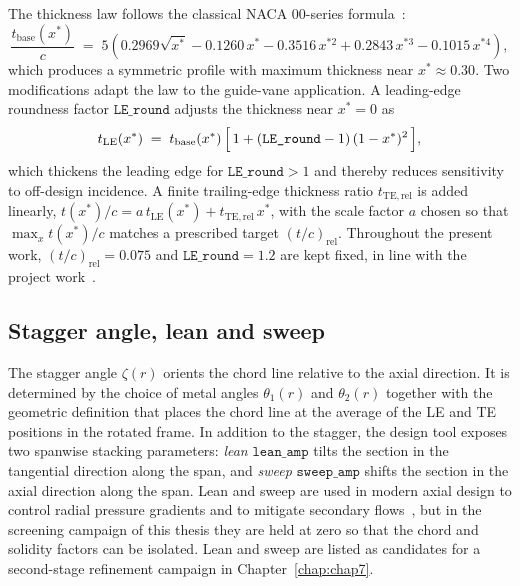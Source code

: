 The thickness law follows the classical NACA 00-series formula~\cite{Abbott1959}:
\begin{equation}
\frac{t_{\mathrm{base}}(x^*)}{c} \;=\; 5\!\left(0.2969\sqrt{x^*} - 0.1260\,x^* - 0.3516\,x^{*2} + 0.2843\,x^{*3} - 0.1015\,x^{*4}\right),
\label{eq:naca_thickness}
\end{equation}
which produces a symmetric profile with maximum thickness near $x^* \approx 0.30$. Two modifications adapt the law to the guide-vane application. A leading-edge roundness factor $\texttt{LE\_round}$ adjusts the thickness near $x^* = 0$ as
\begin{equation}
t_{\mathrm{LE}}(x^*) \;=\; t_{\mathrm{base}}(x^*)\,\Bigl[\,1 + (\texttt{LE\_round}-1)\,(1-x^*)^2\,\Bigr],
\label{eq:LE_round}
\end{equation}
which thickens the leading edge for $\texttt{LE\_round} > 1$ and thereby reduces sensitivity to off-design incidence. A finite trailing-edge thickness ratio $t_{\mathrm{TE,rel}}$ is added linearly, $t(x^*)/c = a\,t_{\mathrm{LE}}(x^*) + t_{\mathrm{TE,rel}}\,x^*$, with the scale factor $a$ chosen so that $\max_x t(x^*)/c$ matches a prescribed target $(t/c)_{\mathrm{rel}}$. Throughout the present work, $(t/c)_{\mathrm{rel}} = 0.075$ and $\texttt{LE\_round} = 1.2$ are kept fixed, in line with the project work~\cite{Leonsen2025}.
 
\subsection{Stagger angle, lean and sweep}
\label{sec:theory_stagger_lean_sweep}
 
The stagger angle $\zeta(r)$ orients the chord line relative to the axial direction. It is determined by the choice of metal angles $\theta_1(r)$ and $\theta_2(r)$ together with the geometric definition that places the chord line at the average of the LE and TE positions in the rotated frame. In addition to the stagger, the design tool exposes two spanwise stacking parameters: \emph{lean} $\texttt{lean\_amp}$ tilts the section in the tangential direction along the span, and \emph{sweep} $\texttt{sweep\_amp}$ shifts the section in the axial direction along the span. Lean and sweep are used in modern axial design to control radial pressure gradients and to mitigate secondary flows~\cite{Schnoes2018}, but in the screening campaign of this thesis they are held at zero so that the chord and solidity factors can be isolated. Lean and sweep are listed as candidates for a second-stage refinement campaign in Chapter~\ref{chap:chap7}.
 
